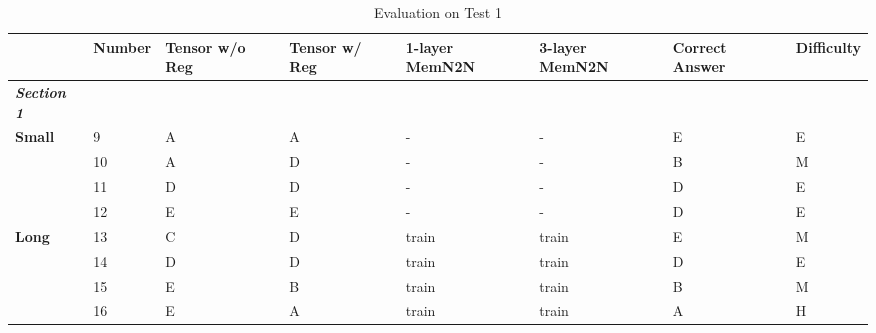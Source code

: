 \documentclass[pageno]{jpaper}
\newcommand{\textbi}[1]{\textbf{\textit{#1}}}
\begin{document}
\begin{table}[]
\scriptsize
\centering
\caption{Evaluation on Test 1}
\label{tab: Evaluation on Test 1}
\begin{tabular}{llllllll}
\toprule
                         & \textbf{Number} & \textbf{Tensor w/o Reg} & \textbf{Tensor w/ Reg} & \textbf{1-layer MemN2N} & \textbf{3-layer MemN2N} & \textbf{Correct Answer} & \textbf{Difficulty} \\ \midrule
\textbi{Section 1}       &                 &                         &                        &                         &                         &                         &                     \\ \midrule
\textbf{Small}           & 9               & A                       & A                      & -                       & -                       & E                       & E                   \\
\textbf{}                & 10              & A                       & D                      & -                       & -                       & B                       & M                   \\
\textbf{}                & 11              & D                       & D                      & -                       & -                       & D                       & E                   \\
\textbf{}                & 12              & E                       & E                      & -                       & -                       & D                       & E                   \\
\textbf{Long}            & 13              & C                       & D                      & train                   & train                   & E                       & M                   \\
\textbf{}                & 14              & D                       & D                      & train                   & train                   & D                       & E                   \\
\textbf{}                & 15              & E                       & B                      & train                   & train                   & B                       & M                   \\
\textbf{}                & 16              & E                       & A                      & train                   & train                   & A                       & H                   \\

\end{tabular}
\end{table}
\end{document}
